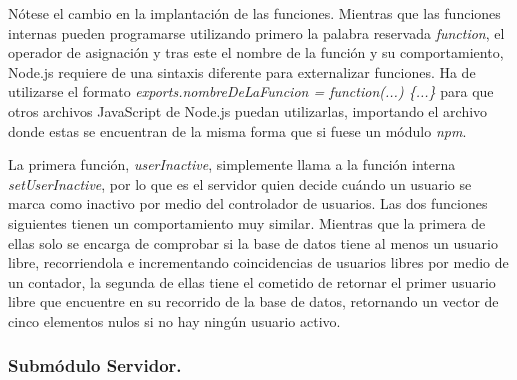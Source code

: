 Nótese el cambio en la implantación de las funciones. Mientras que las funciones internas pueden programarse utilizando primero la palabra reservada \emph{function}, el operador de asignación y tras este el nombre de la función y su comportamiento, Node.js requiere de una sintaxis diferente para externalizar funciones. Ha de utilizarse el formato \emph{exports.nombreDeLaFuncion = function(...) \{...\}} para que otros archivos JavaScript de Node.js puedan utilizarlas, importando el archivo donde estas se encuentran de la misma forma que si fuese un módulo \emph{npm}.


La primera función, \emph{userInactive}, simplemente llama a la función interna \emph{setUserInactive}, por lo que es el servidor quien decide cuándo un usuario se marca como inactivo por medio del controlador de usuarios. Las dos funciones siguientes tienen un comportamiento muy similar. Mientras que la primera de ellas solo se encarga de comprobar si la base de datos tiene al menos un usuario libre, recorriendola e incrementando coincidencias de usuarios libres por medio de un contador, la segunda de ellas tiene el cometido de retornar el primer usuario libre que encuentre en su recorrido de la base de datos, retornando un vector de cinco elementos nulos si no hay ningún usuario activo.

\subsubsection{Submódulo Servidor.} \label{serverSubmodule}

